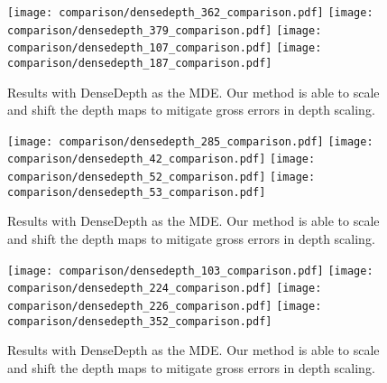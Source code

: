 \begin{figure}[H]
  \texttt{[image: comparison/densedepth\_362\_comparison.pdf]}
  \texttt{[image: comparison/densedepth\_379\_comparison.pdf]}
  \texttt{[image: comparison/densedepth\_107\_comparison.pdf]}
  \texttt{[image: comparison/densedepth\_187\_comparison.pdf]}
  \caption{Results with DenseDepth as the MDE. Our method is able to scale and
    shift the depth maps to mitigate gross errors in depth scaling.}
  \label{fig:densedepth_1}
\end{figure}
\begin{figure}[H]
  \texttt{[image: comparison/densedepth\_285\_comparison.pdf]}
  \texttt{[image: comparison/densedepth\_42\_comparison.pdf]}
  \texttt{[image: comparison/densedepth\_52\_comparison.pdf]}
  \texttt{[image: comparison/densedepth\_53\_comparison.pdf]}
  \caption{Results with DenseDepth as the MDE. Our method is able to scale and
    shift the depth maps to mitigate gross errors in depth scaling.}
  \label{fig:densedepth_2}
\end{figure}
\begin{figure}[H]
  \texttt{[image: comparison/densedepth\_103\_comparison.pdf]}
  \texttt{[image: comparison/densedepth\_224\_comparison.pdf]}
  \texttt{[image: comparison/densedepth\_226\_comparison.pdf]}
  \texttt{[image: comparison/densedepth\_352\_comparison.pdf]}
  \caption{Results with DenseDepth as the MDE. Our method is able to scale and
    shift the depth maps to mitigate gross errors in depth scaling.}
  \label{fig:densedepth_3}
\end{figure}
